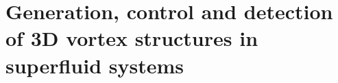 
\chapter{Generation, control and detection of 3D vortex structures in superfluid systems} \label{ch-3d}

